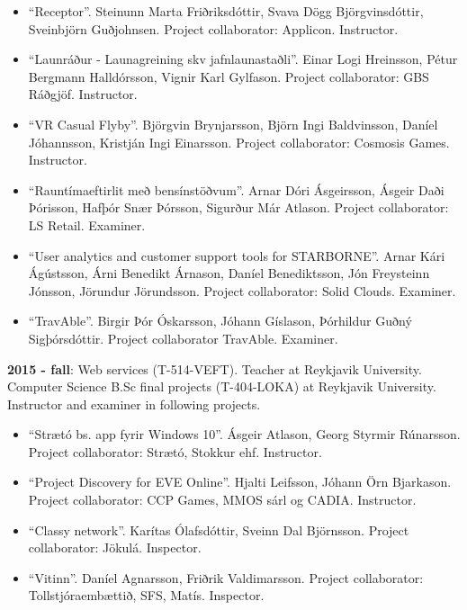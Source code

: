 \begin{itemize}
\item ``Receptor''. Steinunn Marta Friðriksdóttir, Svava Dögg Björgvinsdóttir,
    Sveinbjörn Guðjohnsen. Project collaborator: Applicon. Instructor.

\item ``Launráður - Launagreining skv jafnlaunastaðli''. Einar Logi Hreinsson,
    Pétur Bergmann Halldórsson, Vignir Karl Gylfason. Project collaborator: GBS
        Ráðgjöf. Instructor.

\item ``VR Casual Flyby''. Björgvin Brynjarsson, Björn Ingi Baldvinsson, Daníel
    Jóhannsson, Kristján Ingi Einarsson. Project collaborator: Cosmosis Games.
        Instructor.

\item ``Rauntímaeftirlit með bensínstöðvum''. Arnar Dóri Ásgeirsson, Ásgeir
    Daði Þórisson, Hafþór Snær Þórsson, Sigurður Már Atlason. Project
        collaborator: LS Retail. Examiner.

\item ``User analytics and customer support tools for STARBORNE''. Arnar Kári
    Ágústsson, Árni Benedikt Árnason, Daníel Benediktsson, Jón Freysteinn
        Jónsson, Jörundur Jörundsson. Project collaborator: Solid Clouds.
        Examiner.

\item ``TravAble''. Birgir Þór Óskarsson, Jóhann Gíslason, Þórhildur Guðný
    Sigþórsdóttir. Project collaborator TravAble. Examiner.
\end{itemize}


\textbf{2015 - fall}: Web services (T-514-VEFT). Teacher at Reykjavik
University. Computer Science B.Sc final projects (T-404-LOKA) at Reykjavik
University. Instructor and examiner in following projects.

\begin{itemize}
\item ``Strætó bs. app fyrir Windows 10''. Ásgeir Atlason, Georg Styrmir
    Rúnarsson. Project collaborator: Strætó, Stokkur ehf. Instructor.

\item ``Project Discovery for EVE Online''. Hjalti Leifsson, Jóhann Örn
    Bjarkason. Project collaborator: CCP Games, MMOS sárl og CADIA. Instructor.

\item ``Classy network''. Karítas Ólafsdóttir, Sveinn Dal Björnsson. Project
    collaborator: Jökulá. Inspector.

\item ``Vitinn''. Daníel Agnarsson, Friðrik Valdimarsson. Project collaborator:
    Tollstjóraembættið, SFS, Matís. Inspector.
\end{itemize}



